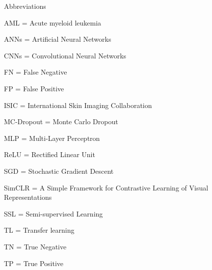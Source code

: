 \thispagestyle{empty}

{ Abbreviations}

\vspace{10mm}

AML = Acute myeloid leukemia

ANNs = Artificial Neural Networks

CNNs = Convolutional Neural Networks

FN = False Negative

FP = False Positive

ISIC = International Skin Imaging Collaboration

MC-Dropout = Monte Carlo Dropout

MLP = Multi-Layer Perceptron

ReLU = Rectified Linear Unit

SGD = Stochastic Gradient Descent

SimCLR =  A Simple Framework for Contrastive Learning of Visual Representations

SSL = Semi-supervised Learning

TL = Transfer learning

TN = True Negative

TP = True Positive

\cleardoublepage{}
